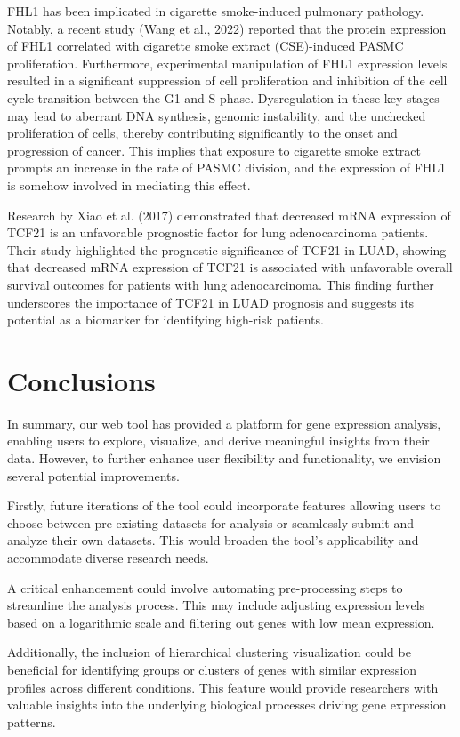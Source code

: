 \documentclass[
	a4paper, %
	10pt, %
	unnumberedsections, %
	twoside, %
]{LTJournalArticle}
\begin{document}
FHL1 has been implicated in cigarette smoke-induced pulmonary pathology. Notably, a recent study (Wang et al., 2022) \autocite{Wang:fhl1} reported that the protein expression of FHL1 correlated with cigarette smoke extract (CSE)-induced PASMC proliferation. Furthermore, experimental manipulation of FHL1 expression levels resulted in a significant suppression of cell proliferation and inhibition of the cell cycle transition between the G1 and S phase. Dysregulation in these key stages may lead to aberrant DNA synthesis, genomic instability, and the unchecked proliferation of cells, thereby contributing significantly to the onset and progression of cancer. This implies that exposure to cigarette smoke extract prompts an increase in the rate of PASMC division, and the expression of FHL1 is somehow involved in mediating this effect.

Research by Xiao et al. (2017) \autocite{Xiao:TCF21} demonstrated that decreased mRNA expression of TCF21 is an unfavorable prognostic factor for lung adenocarcinoma patients. Their study highlighted the prognostic significance of TCF21 in LUAD, showing that decreased mRNA expression of TCF21 is associated with unfavorable overall survival outcomes for patients with lung adenocarcinoma. This finding further underscores the importance of TCF21 in LUAD prognosis and suggests its potential as a biomarker for identifying high-risk patients.

\section{Conclusions}

In summary, our web tool has provided a platform for gene expression analysis, enabling users to explore, visualize, and derive meaningful insights from their data. However, to further enhance user flexibility and functionality, we envision several potential improvements.

Firstly, future iterations of the tool could incorporate features allowing users to choose between pre-existing datasets for analysis or seamlessly submit and analyze their own datasets. This would broaden the tool's applicability and accommodate diverse research needs.

A critical enhancement could involve automating pre-processing steps to streamline the analysis process. This may include adjusting expression levels based on a logarithmic scale and filtering out genes with low mean expression.

Additionally, the inclusion of hierarchical clustering visualization could be beneficial for identifying groups or clusters of genes with similar expression profiles across different conditions. This feature would provide researchers with valuable insights into the underlying biological processes driving gene expression patterns.
\end{document}
